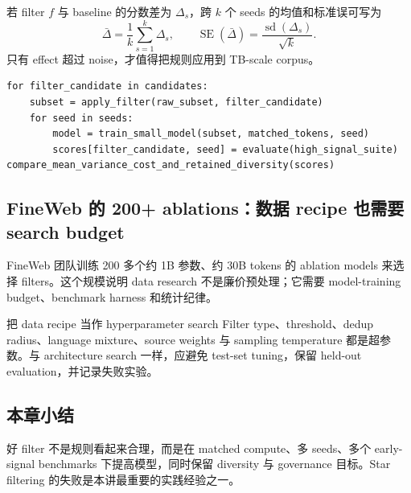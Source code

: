 若 filter $f$ 与 baseline 的分数差为 $\Delta_s$，跨 $k$ 个 seeds 的均值和标准误可写为
\[
\bar\Delta=\frac{1}{k}\sum_{s=1}^{k}\Delta_s,
\qquad
\operatorname{SE}(\bar\Delta)=\frac{\operatorname{sd}(\Delta_s)}{\sqrt{k}}.
\]
只有 effect 超过 noise，才值得把规则应用到 TB-scale corpus。

\begin{lstlisting}[caption={数据过滤 ablation 的最小实验协议}]
for filter_candidate in candidates:
    subset = apply_filter(raw_subset, filter_candidate)
    for seed in seeds:
        model = train_small_model(subset, matched_tokens, seed)
        scores[filter_candidate, seed] = evaluate(high_signal_suite)
compare_mean_variance_cost_and_retained_diversity(scores)
\end{lstlisting}


\subsection{FineWeb 的 200+ ablations：数据 recipe 也需要 search budget}

FineWeb 团队训练 200 多个约 1B 参数、约 30B tokens 的 ablation models 来选择 filters。这个规模说明 data research 不是廉价预处理；它需要 model-training budget、benchmark harness 和统计纪律。


\begin{importantbox}{把 data recipe 当作 hyperparameter search}
Filter type、threshold、dedup radius、language mixture、source weights 与 sampling temperature 都是超参数。与 architecture search 一样，应避免 test-set tuning，保留 held-out evaluation，并记录失败实验。
\end{importantbox}

\subsection{本章小结}

好 filter 不是规则看起来合理，而是在 matched compute、多 seeds、多个 early-signal benchmarks 下提高模型，同时保留 diversity 与 governance 目标。Star filtering 的失败是本讲最重要的实践经验之一。

